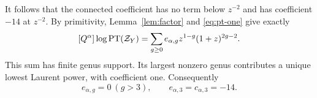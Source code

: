 It follows that the connected coefficient has no term below
$z^{-2}$ and has coefficient $-14$ at $z^{-2}$. By primitivity,
Lemma~\ref{lem:factor} and \eqref{eq:pt-one} give exactly
\begin{equation}\label{eq:primitive-pt}
 [Q^\alpha]\log\operatorname{PT}(\mathcal Z_Y)
 =\sum_{g\ge0}e_{\alpha,g}z^{1-g}(1+z)^{2g-2}.
\end{equation}
This sum has finite genus support. Its largest nonzero genus
contributes a unique lowest Laurent power, with coefficient one.
Consequently
\begin{equation}\label{eq:primitive-count}
 e_{\alpha,g}=0\ (g>3),\qquad
 e_{\alpha,3}=c_{\alpha,3}=-14.
\end{equation}
